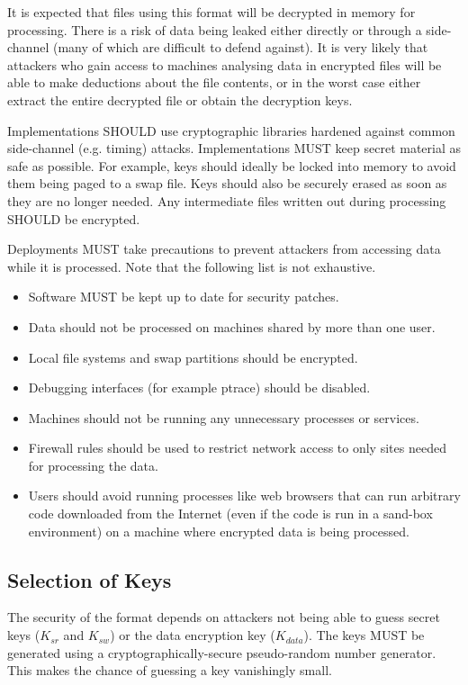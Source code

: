\documentclass[10pt]{article}
\begin{document}
It is expected that files using this format will be decrypted in memory for processing.
There is a risk of data being leaked either directly or through a side-channel (many of which are difficult to defend
against).
It is very likely that attackers who gain access to machines analysing data in encrypted files will be able
to make deductions about the file contents, or in the worst case either extract the entire decrypted file or
obtain the decryption keys.

Implementations SHOULD use cryptographic libraries hardened against common side-channel (e.g. timing) attacks.
Implementations MUST keep secret material as safe as possible.
For example, keys should ideally be locked into memory to avoid them being paged to a swap file.
Keys should also be securely erased as soon as they are no longer needed.
Any intermediate files written out during processing SHOULD be encrypted.

Deployments MUST take precautions to prevent attackers from accessing data while it is processed.
Note that the following list is not exhaustive.
\begin{itemize}
\item Software MUST be kept up to date for security patches.
\item Data should not be processed on machines shared by more than one user.
\item Local file systems and swap partitions should be encrypted.
\item Debugging interfaces (for example ptrace) should be disabled.
\item Machines should not be running any unnecessary processes or services.
\item Firewall rules should be used to restrict network access to only sites needed for processing the data.
\item Users should avoid running processes like web browsers that can run arbitrary code downloaded from the Internet
(even if the code is run in a sand-box environment) on a machine where encrypted data is being processed.
\end{itemize}

\subsection{Selection of Keys}
The security of the format depends on attackers not being able to guess secret keys ($K_{sr}$ and $K_{sw}$)
or the data encryption key ($K_{data}$).
The keys MUST be generated using a cryptographically-secure pseudo-random number generator.
This makes the chance of guessing a key vanishingly small.
\end{document}
